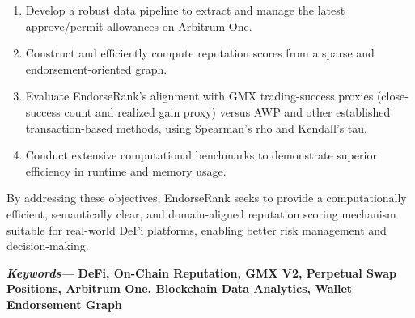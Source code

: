 \begin{enumerate}
\item[1.] Develop a robust data pipeline to extract and manage the latest approve/permit allowances on Arbitrum One.
\item[2.] Construct and efficiently compute reputation scores from a sparse and endorsement-oriented graph.
\item[3.] Evaluate EndorseRank's alignment with GMX trading-success proxies (close-success count and realized gain proxy) versus AWP and other established transaction-based methods, using Spearman's rho and Kendall's tau.
\item[4.] Conduct extensive computational benchmarks to demonstrate superior efficiency in runtime and memory usage.
\end{enumerate}
By addressing these objectives, EndorseRank seeks to provide a computationally efficient, semantically clear, and domain-aligned reputation scoring mechanism suitable for real-world DeFi platforms, enabling better risk management and decision-making.


\textbf{\emph{Keywords--- }}\textbf{DeFi, On-Chain Reputation, GMX V2, Perpetual Swap Positions, Arbitrum One, Blockchain Data Analytics, Wallet Endorsement Graph}

